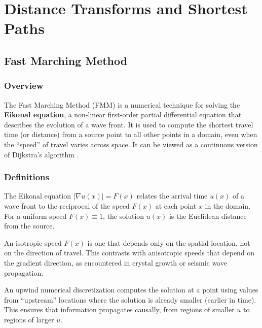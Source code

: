 \chapter{Distance Transforms and Shortest Paths}
\label{ch:distance_paths}

\section{Fast Marching Method}
\label{sec:fast_marching_method}

\subsection{Overview}
The Fast Marching Method (FMM) is a numerical technique for solving the \textbf{Eikonal equation}, a non-linear first-order partial differential equation that describes the evolution of a wave front. It is used to compute the shortest travel time (or distance) from a source point to all other points in a domain, even when the ``speed'' of travel varies across space. It can be viewed as a continuous version of Dijkstra's algorithm \cite{sethian1996,tsitsiklis1995}.

\subsection{Definitions}
\begin{definition}\label{def:eikonal}
The Eikonal equation $|\nabla u(x)| = F(x)$ relates the arrival time $u(x)$ of a wave front to the reciprocal of the speed $F(x)$ at each point $x$ in the domain. For a uniform speed $F(x) \equiv 1$, the solution $u(x)$ is the Euclidean distance from the source.
\end{definition}

\begin{definition}\label{def:isotropic_speed}
An isotropic speed $F(x)$ is one that depends only on the spatial location, not on the direction of travel. This contrasts with anisotropic speeds that depend on the gradient direction, as encountered in crystal growth or seismic wave propagation.
\end{definition}

\begin{definition}\label{def:upwind_scheme}
An upwind numerical discretization computes the solution at a point using values from ``upstream'' locations where the solution is already smaller (earlier in time). This ensures that information propagates causally, from regions of smaller $u$ to regions of larger $u$.
\end{definition}

